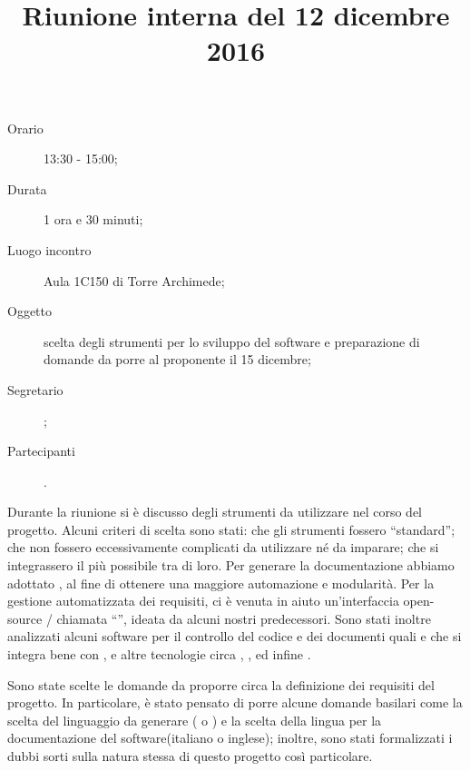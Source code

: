 


\author{\PB}
\supervisor{\MM}
\title{Riunione interna del 12 dicembre 2016}



\maketitle

\begin{description}
	\item[Orario] 13:30 - 15:00;
	\item[Durata] 1 ora e 30 minuti;
	\item[Luogo incontro] Aula 1C150 di Torre Archimede;
	\item[Oggetto] scelta degli strumenti per lo sviluppo del software e preparazione di domande da porre al proponente il 15 dicembre;
	\item[Segretario] \PB; 
	\item[Partecipanti] \ALL.
\end{description}

Durante la riunione si è discusso degli strumenti da utilizzare nel corso del progetto. Alcuni criteri di scelta sono stati: che gli strumenti fossero “standard”; che non fossero eccessivamente complicati da utilizzare né da imparare; che si integrassero il più possibile tra di loro. Per generare la documentazione abbiamo adottato , al fine di ottenere una maggiore automazione e modularità. Per la gestione automatizzata dei requisiti, ci è venuta in aiuto un'interfaccia open-source / chiamata “”, ideata da alcuni nostri predecessori. Sono stati inoltre analizzati alcuni software per il controllo del codice e dei documenti quali  e  che si integra bene con , e altre tecnologie circa , ,  ed infine .

Sono state scelte le domande da proporre circa la definizione dei requisiti del progetto. In particolare, è stato pensato di porre alcune domande basilari come la scelta del linguaggio da generare ( o ) e la scelta della lingua per la documentazione del software(italiano o inglese); inoltre, sono stati formalizzati i dubbi sorti sulla natura stessa di questo progetto così particolare.


